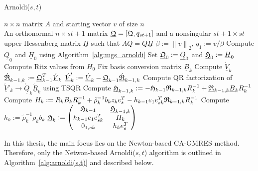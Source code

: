 \documentclass{scrartcl}
\numberwithin{equation}{section}
\newcommand{\norm}[1]{\left\lVert#1\right\rVert}
\begin{document}
\begin{algorithm}
\caption{Arnoldi($s,t$)}
\label{alg:arnoldi(s,t)}
\begin{algorithmic}[1]
    \REQUIRE $n \times n$ matrix $A$ and starting vector $v$ of size $n$\\
    \ENSURE An orthonormal $n \times st + 1$ matrix $\underline{\frak{Q}} = \left[\frak{Q},q_{st + 1}\right]$ and a nonsingular $st + 1 \times st$ upper Hessenberg matrix $\underline{H}$ such that $AQ = \underline{Q} \underline{H}$
    \STATE $\beta := \norm{v}_2$, $q_1 := v/\beta$
    		\STATE Compute $\underline{Q}_0$ and $\underline{H}_0$ using Algorithm~\ref{alg:mgs_arnoldi}
    		\STATE Set $\underline{\frak{Q}}_0 := \underline{Q}_0$ and $\underline{\frak{H}}_0 := \underline{H}_0$
			\STATE Compute Ritz values from $H_0$
    	\ELSE
    		\STATE Fix basis conversion matrix $\underline{B}_k$
    		\STATE Compute $\underline{\acute{V}}_k$
    		\STATE $\underline{\acute{\frak{R}}}_{k - 1, k} := \underline{\frak{Q}}^T_{k - 1} \underline{\acute{V}}_k$
    	\STATE $\underline{\acute{V}}_k' := \underline{\acute{V}}_k - \underline{\frak{Q}}_{k - 1} \underline{\acute{\frak{R}}}_{k - 1, k}$
    	\STATE Compute QR factorization of $\underline{\acute{V}}'_k \rightarrow \underline{\acute{Q}}_k \underline{\acute{R}}_k$ using TSQR
    	\STATE Compute $\underline{\frak{H}}_{k - 1, k} := - \frak{H}_{k - 1} \frak{R}_{k - 1, k} R^{-1}_k + \underline{\frak{R}}_{k - 1, k} \underline{B}_k R^{-1}_k$
		\STATE Compute $H_k := R_k B_k R^{-1}_k + \tilde{\rho}^{-1}_k b_k z_k e^T_s - h_{k-1} e_1 e^T_{sk} \frak{R}_{k-1,k} R^{-1}_k$
		\STATE Compute $h_k := \tilde{\rho}^{-1}_k \rho_k b_k$
    	\STATE $\underline{\frak{H}}_k : = 
    	\begin{pmatrix}
    		\frak{H}_{k - 1} & \underline{\frak{H}}_{k - 1, k}\\
    		h_{k - 1} e_1 e_{sk}^T & H_k\\
    		0_{1,sk} & h_k e^T_s
    	\end{pmatrix}$
    	\ENDIF
	\ENDFOR
\end{algorithmic}
\end{algorithm}

In this thesis, the main focus lies on the Newton-based CA-GMRES method. Therefore, only the Netwon-based Arnoldi($s,t$) algorithm is outlined in Algorithm~\ref{alg:arnoldi(s,t)} and described below.\\
\end{document}
